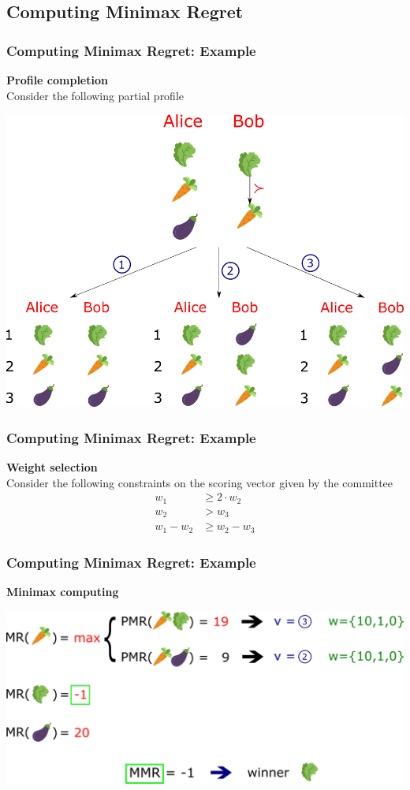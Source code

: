 \documentclass{beamer}
\begin{document}
\subsection{Computing Minimax Regret}
\begin{frame}
	\frametitle{Computing Minimax Regret: Example}
	\textbf{Profile completion}\\
	Consider the following partial profile
	\begin{center}
		\includegraphics[scale=0.35]{completion2.png}
	\end{center}
\end{frame}
\begin{frame}
	\frametitle{Computing Minimax Regret: Example}
	\textbf{Weight selection}\\
	Consider the following constraints on the scoring vector given by the committee 
	\begin{align*}
		w_1 &\geq 2 \cdot w_2 \\
		w_2 &> w_3 \\
		w_1 - w_2 &\geq w_2 - w_3 
	\end{align*}
\end{frame}
\begin{frame}
	\frametitle{Computing Minimax Regret: Example}
	\textbf{Minimax computing}\\
	\begin{center}
		\includegraphics[scale=0.35]{comp.png}
	\end{center}
\end{frame}
\end{document}
